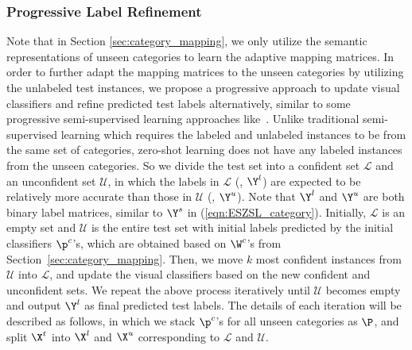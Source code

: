 \documentclass[journal]{IEEEtran}
\begin{document}

\subsubsection{Progressive Label Refinement} \label{sec:progressive_refinement}
Note that in Section \ref{sec:category_mapping}, we only utilize the semantic representations of  unseen categories to learn the adaptive mapping matrices. In order to further adapt the mapping matrices to the unseen categories by utilizing the unlabeled test instances, we propose a progressive approach to update visual classifiers and refine predicted test labels alternatively, similar to some progressive semi-supervised learning approaches like~\cite{blum1998combining}. Unlike traditional semi-supervised learning which requires the labeled and unlabeled instances to be from the same set of categories, zero-shot learning does not have any labeled instances from the unseen categories. So we divide the test set into a confident set $\mathcal{L}$ and an unconfident set $\mathcal{U}$, in which the labels in $\mathcal{L}$ (\ie, $\Y^l$) are expected to be relatively more accurate than those in $\mathcal{U}$ (\ie, $\Y^u$). Note that $\Y^l$ and $\Y^u$ are both binary label matrices, similar to $\Y^s$ in (\ref{eqn:ESZSL_category}). Initially, $\mathcal{L}$ is an empty set and $\mathcal{U}$ is the entire test set with initial labels predicted by the initial classifiers $\p^c$'s, which are obtained based on $\W^c$'s from Section~\ref{sec:category_mapping}. Then, we move $k$ most confident instances from $\mathcal{U}$ into $\mathcal{L}$, and update the visual classifiers based on the new confident and unconfident sets. We repeat the above process iteratively until $\mathcal{U}$ becomes empty and output $\Y^l$ as final predicted test labels. The details of each iteration will be described as follows, in which we stack $\p^c$'s for all unseen categories as $\P$, and split $\X^t$ into $\X^l$ and $\X^u$ corresponding to $\mathcal{L}$ and $\mathcal{U}$.
\end{document}
